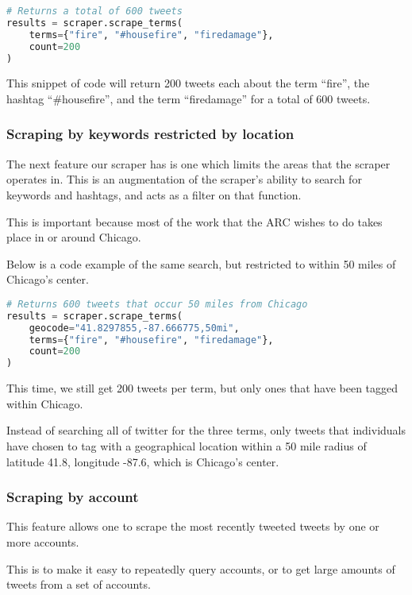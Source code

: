 \documentclass[titlepage, 12pt]{article}
\begin{document}
\begin{lstlisting}[language=Python,caption=Scraping multiple keywords]
# Returns a total of 600 tweets
results = scraper.scrape_terms(
    terms={"fire", "#housefire", "firedamage"}, 
    count=200
)
\end{lstlisting}

This snippet of code will return 200 tweets each about the term ``fire'', the hashtag ``\#housefire'', and the term ``firedamage'' for a total of 600 tweets.

\subsubsection{Scraping by keywords restricted by location}

The next feature our scraper has is one which limits the areas that the scraper operates in. This is an augmentation of the scraper's ability to search for keywords and hashtags, and acts as a filter on that function.

This is important because most of the work that the ARC wishes to do takes place in or around Chicago.

Below is a code example of the same search, but restricted to within 50 miles of Chicago's center.

\begin{lstlisting}[language=Python,caption=Geo-location scraping filter]
# Returns 600 tweets that occur 50 miles from Chicago
results = scraper.scrape_terms(
    geocode="41.8297855,-87.666775,50mi",
    terms={"fire", "#housefire", "firedamage"}, 
    count=200
)
\end{lstlisting}

This time, we still get 200 tweets per term, but only ones that have been tagged within Chicago.

Instead of searching all of twitter for the three terms, only tweets that individuals have chosen to tag with a geographical location within a 50 mile radius of latitude 41.8, longitude -87.6, which is Chicago's center.

\subsubsection{Scraping by account}

This feature allows one to scrape the most recently tweeted tweets by one or more accounts.

This is to make it easy to repeatedly query accounts, or to get large amounts of tweets from a set of accounts.
\end{document}
